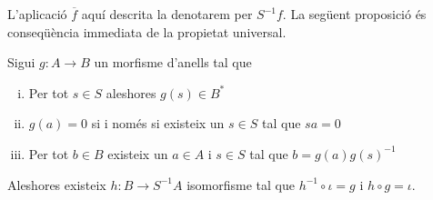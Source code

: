 \documentclass[../../../main.tex]{subfiles}
\begin{document}
L'aplicació $\overline{f}$ aquí descrita la denotarem per $S^{-1}f$. La següent proposició és conseqüència immediata de la propietat universal.

\begin{prop}
Sigui $g:A\to B$ un morfisme d'anells tal que
\begin{enumerate}[(i)]
    \item Per tot $s\in S$ aleshores $g(s)\in B^*$
    \item $g(a) = 0$ si i només si existeix un $s\in S$ tal que $sa = 0$
    \item Per tot $b\in B$ existeix un $a\in A$ i $s\in S$ tal que $b = g(a)g(s)^{-1}$
\end{enumerate}
Aleshores existeix $h:B\to S^{-1}A$ isomorfisme tal que $h^{-1}\circ \iota = g$ i $h\circ g = \iota$.
\end{prop}
\end{document}
